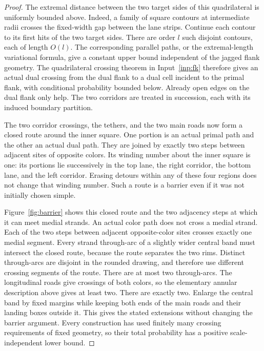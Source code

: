 \begin{proof}
The extremal distance between the two target sides of this
quadrilateral is uniformly bounded above.  Indeed, a family of
square contours at intermediate radii crosses the fixed-width gap
between the lane strips.  Continue each contour to its first hits
of the two target sides.  There are order $l$ such disjoint
contours, each of length $O(l)$.  The corresponding parallel paths,
or the extremal-length variational formula, give a constant upper
bound independent of the jagged flank geometry.  The quadrilateral
crossing theorem in Input~\ref{inp:fk} therefore gives an actual dual
crossing from the dual flank to a dual cell incident to the primal
flank, with conditional probability bounded below.  Already open
edges on the dual flank only help.  The two corridors are treated
in succession, each with its induced boundary partition.

The two corridor crossings, the tethers, and the two main roads now
form a closed route around the inner square.  One portion is an
actual primal path and the other an actual dual path.  They are
joined by exactly two steps between adjacent sites of opposite
colors.  Its winding number about the inner square is one: its
portions lie successively in the top lane, the right corridor, the
bottom lane, and the left corridor.  Erasing detours within any of
these four regions does not change that winding number.  Such a
route is a barrier even if it was not initially chosen simple.

Figure~\ref{fig:barrier} shows this closed route and the two
adjacency steps at which it can meet medial strands.
An actual color path does not cross a medial strand.  Each of the
two steps between adjacent opposite-color sites crosses exactly
one medial segment.  Every strand through-arc of a slightly wider
central band must intersect the closed route, because the route
separates the two rims.  Distinct through-arcs are disjoint in the
rounded drawing, and therefore use different crossing segments of
the route.  There are at most two through-arcs.  The longitudinal
roads give crossings of both colors, so the elementary annular
description above gives at least two.  There are exactly two.
Enlarge the central band by fixed margins while keeping both ends
of the main roads and their landing boxes outside it.  This gives
the stated extensions without changing the barrier argument.
Every construction has used finitely many crossing requirements
of fixed geometry, so their total probability has a positive
scale-independent lower bound.
\end{proof}

